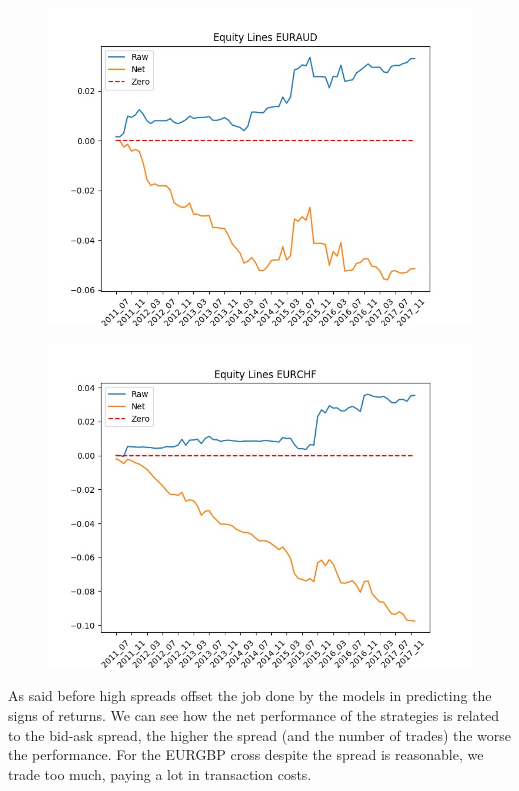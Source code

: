 \documentclass[a4paper]{article}
\begin{document}
\begin{figure}
\begin{minipage}{.5\textwidth}
		\includegraphics[width=\linewidth]{Figures/EURAUD.jpeg}
		\label{fig:13}
	\end{minipage}%
	\begin{minipage}{.5\textwidth}
		\centering
		\includegraphics[width=\linewidth]{Figures/EURCHF.jpeg}
		\label{fig:14}
	\end{minipage}
\end{figure}

As said before high spreads offset the job done by the models in predicting the signs of returns. We can see how the net performance of the strategies is related to the bid-ask spread, the higher the spread (and the number of trades) the worse the performance. For the EURGBP cross despite the spread is reasonable, we trade too much, paying a lot in transaction costs.\\
\end{document}
